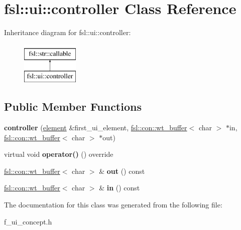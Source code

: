 \hypertarget{classfsl_1_1ui_1_1controller}{}\section{fsl\+::ui\+::controller Class Reference}
\label{classfsl_1_1ui_1_1controller}
Inheritance diagram for fsl\+::ui\+::controller\+:\begin{figure}[H]
\begin{center}
\leavevmode
\includegraphics[height=2.000000cm]{classfsl_1_1ui_1_1controller}
\end{center}
\end{figure}
\subsection*{Public Member Functions}
\begin{DoxyCompactItemize}
\item 
\mbox{\label{classfsl_1_1ui_1_1controller_a4b82bb42fc1c6028407249fa03181061}} 
{\bfseries controller} (\mbox{\hyperlink{classfsl_1_1ui_1_1element}{element}} \&first\+\_\+ui\+\_\+element, \mbox{\hyperlink{classfsl_1_1con_1_1wt__buffer}{fsl\+::con\+::wt\+\_\+buffer}}$<$ char $>$ $\ast$in, \mbox{\hyperlink{classfsl_1_1con_1_1wt__buffer}{fsl\+::con\+::wt\+\_\+buffer}}$<$ char $>$ $\ast$out)
\item 
\mbox{\label{classfsl_1_1ui_1_1controller_acc77c77d97c32cb0bfd715a12d8fbddf}} 
virtual void {\bfseries operator()} () override
\item 
\mbox{\label{classfsl_1_1ui_1_1controller_a5032f971755355fe42c238caee340808}} 
\mbox{\hyperlink{classfsl_1_1con_1_1wt__buffer}{fsl\+::con\+::wt\+\_\+buffer}}$<$ char $>$ \& {\bfseries out} () const
\item 
\mbox{\label{classfsl_1_1ui_1_1controller_a4670ca71fd16ad9716071186244f4428}} 
\mbox{\hyperlink{classfsl_1_1con_1_1wt__buffer}{fsl\+::con\+::wt\+\_\+buffer}}$<$ char $>$ \& {\bfseries in} () const
\end{DoxyCompactItemize}


The documentation for this class was generated from the following file\+:\begin{DoxyCompactItemize}
\item 
f\+\_\+ui\+\_\+concept.\+h\end{DoxyCompactItemize}
